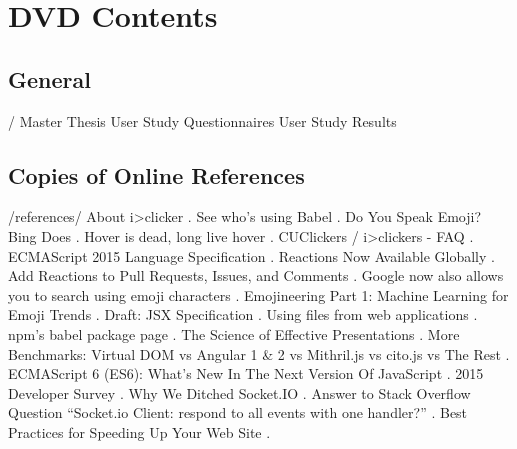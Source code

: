 \chapter{DVD  Contents}
\label{app:cdrom}

\section{General}

\begin{FileList}{/}
 Master Thesis
 User Study Questionnaires
 User Study Results
\end{FileList}

\section{Copies of Online References}

\begin{FileList}{/references/}
 About i>clicker \cite{iclicker}.
 See who's using Babel \cite{babel-users}.
 Do You Speak Emoji? Bing Does \cite{Bing:Emoji}.
 Hover is dead, long live hover \cite{hover}.
 CUClickers / i>clickers - FAQ \cite{cuclickers:faq}.
 ECMAScript 2015 Language Specification \cite{ecma2015}.
 Reactions Now Available Globally \cite{Facebook:Reactions}.
 Add Reactions to Pull Requests, Issues, and Comments \cite{Github:Reactions}.
 Google now also allows you to search using emoji characters \cite{Google:Emoji}.
 Emojineering Part 1: Machine Learning for Emoji Trends \cite{Instagramm:Emoji}.
 Draft: JSX Specification \cite{jsx}.
 Using files from web applications \cite{file-api}.
 npm's babel package page \cite{npm-babel}.
 The Science of Effective Presentations \cite{prezi-science}.
 More Benchmarks: Virtual DOM vs Angular 1 \& 2 vs Mithril.js vs cito.js vs The Rest \cite{react-benchmarks}.
 ECMAScript 6 (ES6): What's New In The Next Version Of JavaScript \cite{es6}.
 2015 Developer Survey \cite{stackoverflow-developer-survey}.
 Why We Ditched Socket.IO \cite{socketio-problems}.
 Answer to Stack Overflow Question ``Socket.io Client: respond to all events with one handler?'' \cite{socket-io-wildcards}.
 Best Practices for Speeding Up Your Web Site \cite{yahoo-speeding-up-website}.
\end{FileList}


